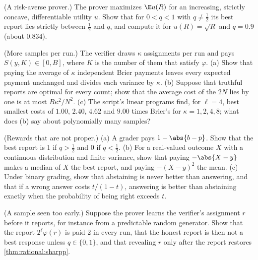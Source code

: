 \begin{refsection}
\begin{exercises}
\item \variation (A risk-averse prover.) The prover maximizes $\E u(R)$ for an increasing, strictly concave, differentiable utility $u$. Show that for $0<q<1$ with $q\ne\frac12$ its best report lies strictly between $\frac12$ and $q$, and compute it for $u(R)=\sqrt R$ and $q=0.9$ (about $0.834$). \label{ex:rational:risk}

\item \variation\harder (More samples per run.) The verifier draws $\kappa$ assignments per run and pays $S(y,K)\in[0,B]$, where $K$ is the number of them that satisfy $\varphi$. (a) Show that paying the average of $\kappa$ independent Brier payments leaves every expected payment unchanged and divides each variance by $\kappa$. (b) Suppose that truthful reports are optimal for every count; show that the average cost of the $2N$ lies by one is at most $B\kappa^2/N^2$. (c) The script's linear programs find, for $\ell=4$, best smallest costs of $1.00$, $2.40$, $4.62$ and $9.00$ times Brier's for $\kappa=1,2,4,8$; what does (b) say about polynomially many samples? \label{ex:rational:samples}

\item \attack (Rewards that are not proper.) (a) A grader pays $1-\abs{b-p}$. Show that the best report is $1$ if $q>\frac12$ and $0$ if $q<\frac12$. (b) For a real-valued outcome $X$ with a continuous distribution and finite variance, show that paying $-\abs{X-y}$ makes a median of $X$ the best report, and paying $-(X-y)^2$ the mean. (c) Under binary grading, show that abstaining is never better than answering, and that if a wrong answer costs $t/(1-t)$, answering is better than abstaining exactly when the probability of being right exceeds $t$.\label{ex:rational:improper}

\item \attack (A sample seen too early.) Suppose the prover learns the verifier's assignment $r$ before it reports, for instance from a predictable random generator. Show that the report $2^\ell\varphi(r)$ is paid $2$ in every run, that the honest report is then not a best response unless $q\in\{0,1\}$, and that revealing $r$ only after the report restores \cref{thm:rational:sharpp}.\label{ex:rational:early}


\end{exercises}
\end{refsection}
